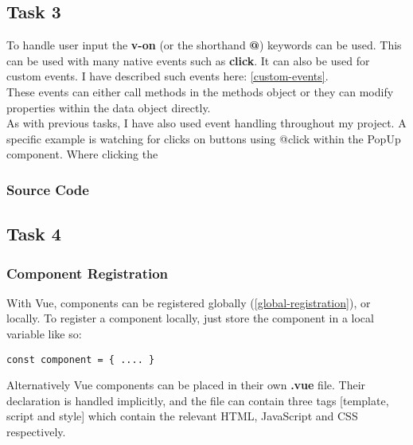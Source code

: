 \documentclass[portfolio.tex]{subfiles}
\begin{document}
			\subsection{Task 3}
				To handle user input the \textbf{v-on} (or the shorthand \textbf{@}) keywords can be used. This can be used with many native events such as \textbf{click}. It can also be used for custom events. I have described such events here: \ref{custom-events}. \\

				These events can either call methods in the methods object or they can modify properties within the data object directly. \\

				As with previous tasks, I have also used event handling throughout my project. A specific example is watching for clicks on buttons using @click within the PopUp component. Where clicking the \\

				\subsubsection{Source Code}


			\subsection{Task 4}
				\label{task4}
				\subsubsection{Component Registration}
					With Vue, components can be registered globally (\ref{global-registration}), or locally. To register a component locally, just store the component in a local variable like so:\\

					\begin{lstlisting}
const component = { .... }
					\end{lstlisting}

					\bigbreak

					Alternatively Vue components can be placed in their own \textbf{.vue} file. Their declaration is handled implicitly, and the file can contain three tags [template, script and style] which contain the relevant HTML, JavaScript and CSS respectively.\\
\end{document}
